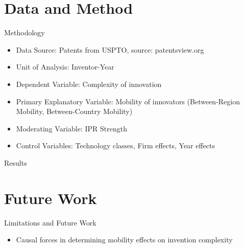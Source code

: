 \documentclass{beamer}
\begin{document}
\section{Data and Method}
\begin{frame}{Methodology}{}
\begin{itemize}
\item{Data Source: Patents from USPTO, source: patentsview.org}
\item{Unit of Analysis: Inventor-Year}
\item{Dependent Variable: Complexity of innovation}
\item{Primary Explanatory Variable: Mobility of innovators (Between-Region Mobility, Between-Country Mobility)}
\item{Moderating Variable: IPR Strength }
\item{Control Variables: Technology classes, Firm effects, Year effects}
\end{itemize}
\end{frame}

\begin{frame}{Results}{}

\end{frame}

\section{Future Work}
\begin{frame}{Limitations and Future Work}{}
\begin{itemize}
\item{Causal forces in determining mobility effects on invention complexity}
\end{itemize}
\end{frame}



\end{document}

